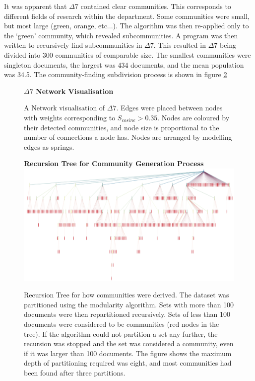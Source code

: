 It was apparent that $\Delta7$ contained clear communities. This corresponds to different fields of research within the department. Some communities were small, but most large (green, orange, etc...). The algorithm was then re-applied only to the `green' community, which revealed subcommunities. A program was then written to recursively find subcommunities in $\Delta7$. This resulted in $\Delta7$ being divided into 300 communities of comparable size. The smallest communities were singleton documents, the largest was 434 documents, and the mean population was 34.5. The community-finding subdivision process is shown in figure \ref{fig:COMMTREE}
\newpage
\addtocounter{page}{-2}
\begin{center}
\begin{figure}[H]
  \centering
  \textbf{$\Delta7$ Network Visualisation}\par\medskip
    \caption[Network Visualisation of University of Cambridge Chemistry Department Documents]{A Network visualisation of  $\Delta7$. Edges were placed between nodes with weights corresponding to $S_{cosine} > 0.35$. Nodes are coloured by their detected communities, and node size is proportional to the number of connections a node has. Nodes are arranged by modelling edges as springs.}
    \label{fig:CAMCOMMUNITIES}
\end{figure} 
\end{center}
\newpage
\addtocounter{page}{1}

\begin{center}
\begin{figure}[H]
  \centering
  \textbf{Recursion Tree for Community Generation Process}
    \includegraphics[width=\textwidth]{Analysis/comms.png}
    \caption[Recursion Tree for Document Community Generation]{Recursion Tree for how communities were derived. The dataset was partitioned using the modularity algorithm. Sets with more than 100 documents were then repartitioned recursively. Sets of less than 100 documents were considered to be communities (red nodes in the tree). If the algorithm could not partition a set any further, the recursion was stopped and the set was considered a community, even if it was larger than 100 documents.  The figure shows the maximum depth of partitioning required was eight, and most communities had been found after three partitions.}
    \label{fig:COMMTREE}
\end{figure} 
\end{center}

